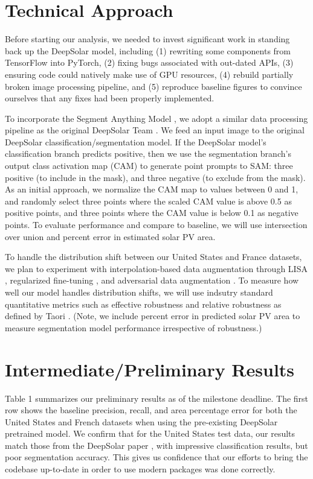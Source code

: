 \documentclass[10pt,twocolumn,letterpaper]{article}
\begin{document}
\section{Technical Approach}
Before starting our analysis, we needed to invest significant work in standing back up the DeepSolar model, including (1) rewriting some components from TensorFlow into PyTorch, (2) fixing bugs associated with out-dated APIs, (3) ensuring code could natively make use of GPU resources, (4) rebuild partially broken image processing pipeline, and (5) reproduce baseline figures to convince ourselves that any fixes had been properly implemented.

To incorporate the Segment Anything Model \cite{kirillov2023segment}, we adopt a similar data processing pipeline as the original DeepSolar Team \cite{DeepSolar1}. We feed an input image to the original DeepSolar classification/segmentation model. If the DeepSolar model's classification branch predicts positive, then we use the segmentation branch's output class activation map (CAM) to generate point prompts to SAM: three positive (to include in the mask), and three negative (to exclude from the mask). As an initial approach, we normalize the CAM map to values between 0 and 1, and randomly select three points where the scaled CAM value is above 0.5 as positive points, and three points where the CAM value is below 0.1 as negative points. To evaluate performance and compare to baseline, we will use intersection over union and percent error in estimated solar PV area. 

To handle the distribution shift between our United States and France datasets, we plan to experiment with interpolation-based data augmentation through LISA \cite{yao2022improving}, regularized fine-tuning \cite{li2021}, and adversarial data augmentation \cite{volpi2018generalizing}. To measure how well our model handles distribution shifts, we will use indsutry standard quantitative metrics such as effective robustness and relative robustness as defined by Taori \cite{Taori2020}. (Note, we include percent error in predicted solar PV area to measure segmentation model performance irrespective of robustness.) 


\section{Intermediate/Preliminary Results}
Table 1 summarizes our preliminary results as of the milestone deadline. The first row shows the baseline precision, recall, and area percentage error for both the United States and French datasets when using the pre-existing DeepSolar pretrained model. We confirm that for the United States test data, our results match those from the DeepSolar paper \cite{DeepSolar1}, with impressive classification results, but poor segmentation accuracy. This gives us confidence that our efforts to bring the codebase up-to-date in order to use modern packages was done correctly. 
\end{document}
